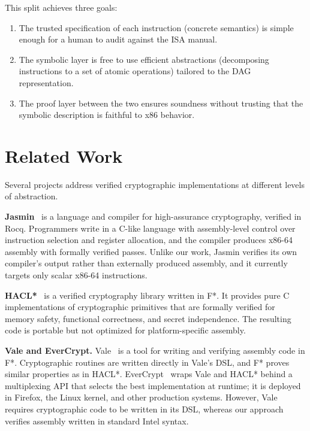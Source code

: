 This split achieves three goals:
\begin{enumerate}
    \item The trusted specification of each instruction (concrete semantics) is simple enough for a human to audit against the ISA manual.
    \item The symbolic layer is free to use efficient abstractions (decomposing instructions to a set of atomic operations) tailored to the DAG representation.
    \item The proof layer between the two ensures soundness without trusting that the symbolic description is faithful to x86 behavior.
\end{enumerate}

\section{Related Work}
\label{sec:related-work}

Several projects address verified cryptographic implementations at different levels of abstraction.

\textbf{Jasmin}~\autocite{jasmin2017} is a language and compiler for high-assurance cryptography, verified in Rocq.
Programmers write in a C-like language with assembly-level control over instruction selection and register allocation, and the compiler produces x86-64 assembly with formally verified passes.
Unlike our work, Jasmin verifies its own compiler's output rather than externally produced assembly, and it currently targets only scalar x86-64 instructions.

\textbf{HACL*}~\autocite{hacl2017} is a verified cryptography library written in F*. It provides pure C implementations of cryptographic primitives that are formally verified for memory safety, functional correctness, and secret independence. The resulting code is portable but not optimized for platform-specific assembly.

\textbf{Vale and EverCrypt.}
Vale~\autocite{vale2017} is a tool for writing and verifying assembly code in F*.
Cryptographic routines are written directly in Vale's DSL, and F* proves similar properties as in HACL*.
EverCrypt~\autocite{evercrypt2020} wraps Vale and HACL* behind a multiplexing API that selects the best implementation at runtime; it is deployed in Firefox, the Linux kernel, and other production systems.
However, Vale requires cryptographic code to be written in its DSL, whereas our approach verifies assembly written in standard Intel syntax.

